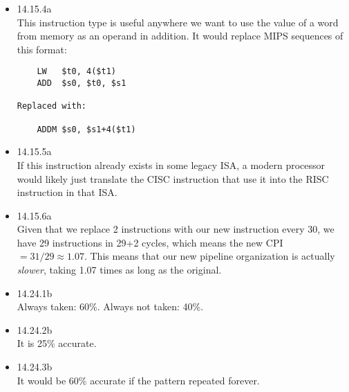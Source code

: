 \documentclass[a4paper]{article}
\begin{document}
\begin{itemize}
\item{14.15.4a} \\
This instruction type is useful anywhere we want to use the value of a word from memory as an operand in addition. It would replace MIPS sequences of this format:
\begin{verbatim}
    LW   $t0, 4($t1)
    ADD  $s0, $t0, $s1

Replaced with:

    ADDM $s0, $s1+4($t1)
\end{verbatim}


\item{14.15.5a} \\
If this instruction already exists in some legacy ISA, a modern processor would likely just translate the CISC instruction that use it into the RISC instruction in that ISA.
\\

\item{14.15.6a} \\
Given that we replace 2 instructions with our new instruction every 30, we have 29 instructions in 29+2 cycles, which means the new CPI $= 31/29 \approx 1.07$. This means that our new pipeline organization is actually \emph{slower}, taking 1.07 times as long as the original.
\\

\item{14.24.1b} \\
Always taken: 60\%.
Always not taken: 40\%.
\\

\item{14.24.2b} \\
It is 25\% accurate.
\\

\item{14.24.3b} \\
It would be 60\% accurate if the pattern repeated forever.
\\
\\
\end{itemize}
\end{document}
